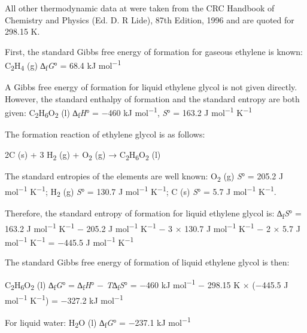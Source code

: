 \documentclass{article}
\begin{document}
All other thermodynamic data at were taken from the CRC Handbook of Chemistry and Physics (Ed. D. R Lide), 87th Edition, 1996 and are quoted for 298.15 K.

First, the standard Gibbs free energy of formation for gaseous ethylene is known: C\textsubscript{2}H\textsubscript{4} (g) ∆\textsubscript{f}\emph{G}° = 68.4 kJ mol\textsuperscript{−1}

A Gibbs free energy of formation for liquid ethylene glycol is not given directly. However, the standard enthalpy of formation and the standard entropy are both given: C\textsubscript{2}H\textsubscript{6}O\textsubscript{2} (l) ∆\textsubscript{f}\emph{H}° = −460 kJ mol\textsuperscript{−1}, \emph{S}° = 163.2 J mol\textsuperscript{−1} K\textsuperscript{−1}

The formation reaction of ethylene glycol is as follows:

\begin{center}
2C (s) + 3 H\textsubscript{2} (g) + O\textsubscript{2} (g) → C\textsubscript{2}H\textsubscript{6}O\textsubscript{2} (l)
\end{center}

The standard entropies of the elements are well known: O\textsubscript{2} (g) \emph{S}° = 205.2 J mol\textsuperscript{−1} K\textsuperscript{−1}; H\textsubscript{2} (g) \emph{S}° = 130.7 J mol\textsuperscript{−1} K\textsuperscript{−1}; C (s) \emph{S}° = 5.7 J mol\textsuperscript{−1} K\textsuperscript{−1}.

Therefore, the standard entropy of formation for liquid ethylene glycol is: ∆\textsubscript{f}\emph{S}° = 163.2 J mol\textsuperscript{−1} K\textsuperscript{−1} − 205.2 J mol\textsuperscript{−1} K\textsuperscript{−1} − 3 × 130.7 J mol\textsuperscript{−1} K\textsuperscript{−1} − 2 × 5.7 J mol\textsuperscript{−1} K\textsuperscript{−1} = −445.5 J mol\textsuperscript{−1} K\textsuperscript{−1}

The standard Gibbs free energy of formation of liquid ethylene glycol is then:

\begin{center}
C\textsubscript{2}H\textsubscript{6}O\textsubscript{2} (l) ∆\textsubscript{f}\emph{G}° = ∆\textsubscript{f}\emph{H}° − \emph{T}∆\textsubscript{f}\emph{S}° = −460 kJ mol\textsuperscript{−1} − 298.15 K × (−445.5 J mol\textsuperscript{−1} K\textsuperscript{−1}) = −327.2 kJ mol\textsuperscript{−1}
\end{center}

For liquid water: H\textsubscript{2}O (l) ∆\textsubscript{f}\emph{G}° = −237.1 kJ mol\textsuperscript{−1}
\end{document}
